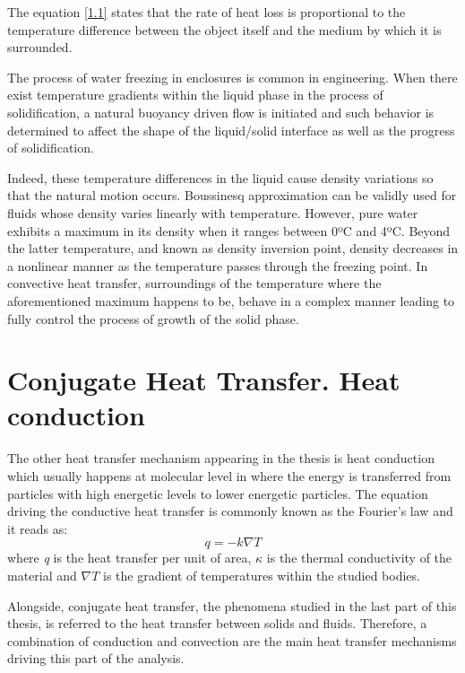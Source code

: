 \noindent The equation \ref{1.1} states that the rate of heat loss is proportional to the temperature difference between the object itself and the medium by which it is surrounded.

\noindent The process of water freezing in enclosures is common in engineering. When there exist temperature gradients within the liquid phase in the process of solidification, a natural buoyancy driven flow is initiated and such behavior is determined to affect the shape of the liquid/solid interface as well as the progress of solidification.

\noindent Indeed, these temperature differences in the liquid cause density variations so that the natural motion occurs. Boussinesq approximation can be validly used for fluids whose density varies linearly with temperature. However, pure water exhibits a maximum in its density when it ranges between 0ºC and 4ºC. Beyond the latter temperature, and known as density inversion point, density decreases in a nonlinear manner as the temperature passes through the freezing point. In convective heat transfer, surroundings of the temperature where the aforementioned maximum happens to be, behave in a complex manner leading to fully control the process of growth of the solid phase.


\section{Conjugate Heat Transfer. Heat conduction}
\setlength{\parindent}{0.5cm} The other heat transfer mechanism appearing in the thesis is heat conduction which usually happens at molecular level in where the energy is transferred from particles with high energetic levels to lower energetic particles. The equation driving the conductive heat transfer is commonly known as the Fourier's law and it reads as: 
\begin{equation}
	q=-k \nabla T
	\label{1.2}
\end{equation}
where \textit{q} is the heat transfer per unit of area, $\kappa$ is the thermal conductivity of the material and $\nabla T$ is the gradient of temperatures within the studied bodies.

\noindent Alongside, conjugate heat transfer, the phenomena studied in the last part of this thesis, is referred to the heat transfer between solids and fluids. Therefore, a combination of conduction and convection are the main heat transfer mechanisms driving this part of the analysis.


